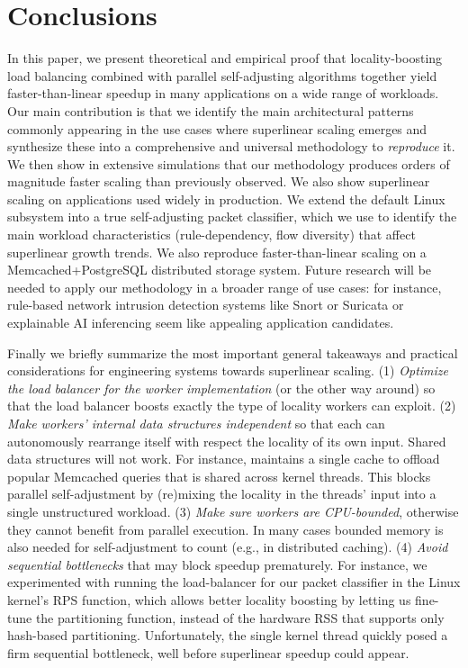 \section{Conclusions}\label{sec:conclusions}

In this paper, we present theoretical and empirical proof that locality-boosting load balancing combined with parallel self-adjusting algorithms together yield faster-than-linear speedup in many applications on a wide range of workloads. Our main contribution is that we identify the main architectural patterns commonly appearing in the use cases where superlinear scaling emerges and synthesize these into a comprehensive and universal methodology to \emph{reproduce} it.  We then show in extensive simulations that our methodology produces orders of magnitude faster scaling than previously observed. We also show superlinear scaling on applications used widely in production. We extend the default \nftables Linux subsystem into a true self-adjusting packet classifier, which we use to identify the main workload characteristics (rule-dependency, flow diversity) that affect superlinear growth trends.  We also reproduce faster-than-linear scaling on a Memcached+PostgreSQL distributed storage system. Future research will be needed to apply our methodology in a broader range of use cases: for instance, rule-based network intrusion detection systems like Snort or Suricata \cite{10.5555/2537857.2537883} or explainable AI inferencing seem like appealing application candidates.

Finally we briefly summarize the most important general takeaways and practical considerations for engineering systems towards superlinear scaling. (1) \emph{Optimize the load balancer for the worker implementation} (or the other way around) so that the load balancer boosts exactly the type of locality workers can exploit. (2) \emph{Make workers' internal data structures independent} so that each can autonomously rearrange itself with respect the locality of its own input. Shared data structures will not work. For instance, \cite{ghigoff2021bmc} maintains a single cache to offload popular Memcached queries that is shared across kernel threads. This blocks parallel self-adjustment by (re)mixing the locality in the threads' input into a single unstructured workload. (3) \emph{Make sure workers are CPU-bounded}, otherwise they cannot benefit from parallel execution. In many cases bounded memory is also needed for self-adjustment to count (e.g., in distributed caching). (4) \emph{Avoid sequential bottlenecks} that may block speedup prematurely. For instance, we experimented with running the load-balancer for our packet classifier in the Linux kernel's RPS function, which allows better locality boosting by letting us fine-tune the partitioning function, instead of the hardware RSS that supports only hash-based partitioning. Unfortunately, the single kernel thread quickly posed a firm sequential bottleneck, well before superlinear speedup could appear.



